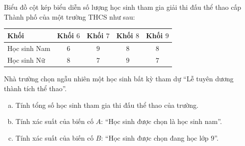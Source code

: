 \begin{bt}%
Biểu đồ cột kép biểu diễn số lượng học sinh tham gia giải thi đấu thể thao cấp Thành phố của một trường THCS như sau:
\begin{center}
\begin{tabular}{|l|c|c|c|c|}
	\hline
	Khối & Khối $6$ & Khối $7$ & Khối $8$ & Khối $9$ \\ \hline
	Học sinh Nam & $6$ & $9$ & $8$ & $8$ \\ \hline
	Học sinh Nữ & $8$ & $7$ & $9$ & $7$ \\ \hline
\end{tabular}
\end{center}
Nhà trường chọn ngẫu nhiên một học sinh bất kỳ tham dự ``Lễ tuyên dương thành tích thể thao''.
\begin{enumerate}[a)]
	\item Tính tổng số học sinh tham gia thi đấu thể thao của trường.
	\item Tính xác suất của biến cố $A$: ``Học sinh được chọn là học sinh nam''.
	\item Tính xác suất của biến cố $B$: ``Học sinh được chọn đang học lớp $9$''.
\end{enumerate}
\end{bt}

